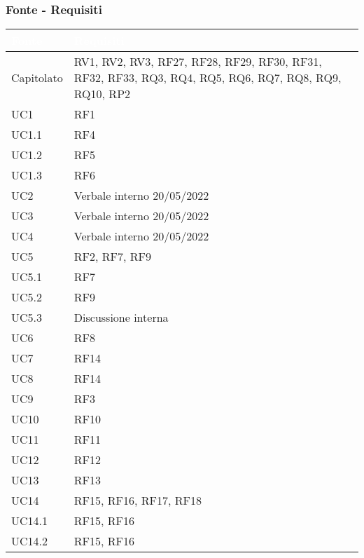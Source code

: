\subsubsection{Fonte - Requisiti}
{
      \setlength{\freewidth}{\dimexpr\textwidth-0\tabcolsep}
      \renewcommand{\arraystretch}{1.5}
      \centering
      \setlength{\aboverulesep}{0pt}
      \setlength{\belowrulesep}{0pt}
      \begin{longtable}{C{.47\freewidth} C{.47\freewidth}}
         \toprule
      \textcolor{white}{\textbf{Fonte}}&
      \textcolor{white}{\textbf{Requisiti}}\\
      \toprule
      \endhead
      
      Capitolato & RV1, RV2, RV3, RF27, RF28, RF29, RF30, RF31, RF32, RF33,
                   RQ3, RQ4, RQ5, RQ6, RQ7, RQ8, RQ9, RQ10,
                   RP2\\
      UC1 & RF1\\
      UC1.1 & RF4\\
      UC1.2 & RF5\\
      UC1.3 & RF6\\
      UC2 & Verbale interno 20/05/2022\\
      UC3 & Verbale interno 20/05/2022\\
      UC4 & Verbale interno 20/05/2022\\
      UC5 & RF2, RF7, RF9\\
      UC5.1 & RF7\\
      UC5.2 & RF9\\
      UC5.3 & Discussione interna\\
      UC6 & RF8\\
      UC7 & RF14\\
      UC8 & RF14\\
      UC9 & RF3\\
      UC10 & RF10\\
      UC11 & RF11\\
      UC12 & RF12\\
      UC13 & RF13\\
      UC14 & RF15, RF16, RF17, RF18\\
      UC14.1 & RF15, RF16\\
      UC14.2 & RF15, RF16\\

\end{longtable}}
